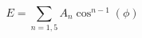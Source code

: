 \documentclass[12pt]{article}
\begin{document}
$$  
  E = \sum_{n=1,5} A_n  \cos^{n-1}(\phi)
$$
\end{document}
